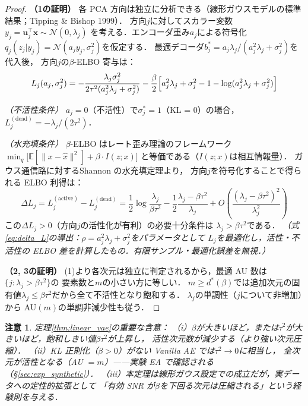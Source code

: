 \documentclass[11pt,a4paper]{jsarticle}
\newtheorem{remark}{注意}
\begin{document}
\begin{proof}
\textbf{（1の証明）}
各 PCA 方向は独立に分析できる（線形ガウスモデルの標準結果；Tipping \& Bishop 1999）．
方向$j$に対してスカラー変数$y_j = \boldsymbol{u}_j^\top \boldsymbol{x} \sim \mathcal{N}(0, \lambda_j)$
を考える．エンコーダ重み$a_j$による符号化$q_j(z_j|y_j) = \mathcal{N}(a_j y_j, \sigma_j^2)$を仮定する．
最適デコーダ$b_j^* = a_j\lambda_j/(a_j^2\lambda_j + \sigma_j^2)$を代入後，
方向$j$の$\beta$-ELBO 寄与は：
\begin{equation}
  L_j(a_j, \sigma_j^2)
  = -\frac{\lambda_j \sigma_j^2}{2\tau^2(a_j^2\lambda_j + \sigma_j^2)}
    - \frac{\beta}{2}\Bigl[a_j^2\lambda_j + \sigma_j^2 - 1 - \log(a_j^2\lambda_j + \sigma_j^2)\Bigr]
  \label{eq:elbo_j}
\end{equation}

\textit{（不活性条件）}
$a_j = 0$（不活性）で$\sigma_j^* = 1$（KL = 0）の場合，$L_j^{(\mathrm{dead})} = -\lambda_j/(2\tau^2)$．

\textit{（水充填条件）}
$\beta$-ELBO はレート歪み理論\cite{cover2006elements}のフレームワーク
$\min_{q}\bigl[\mathbb{E}[\|x - \hat{x}\|^2] + \beta \cdot I(z;x)\bigr]$
と等価である（$I(z;x)$は相互情報量）．
ガウス通信路に対するShannon の水充填定理\cite{cover2006elements}より，
方向$j$を符号化することで得られる ELBO 利得は：
\begin{equation}
  \Delta L_j = L_j^{(\mathrm{active})} - L_j^{(\mathrm{dead})}
  = \frac{1}{2}\log\frac{\lambda_j}{\beta\tau^2} - \frac{1}{2}\frac{\lambda_j - \beta\tau^2}{\lambda_j} + O\!\left(\frac{(\lambda_j - \beta\tau^2)^2}{\lambda_j^2}\right)
  \label{eq:delta_L}
\end{equation}
この$\Delta L_j > 0$（方向$j$の活性化が有利）の必要十分条件は
$\lambda_j > \beta\tau^2$である．
\textit{（式\eqref{eq:delta_L}の導出：$\rho = a_j^2\lambda_j + \sigma_j^2$をパラメータとして
$L_j$を最適化し，活性・不活性の ELBO 差を計算したもの．有限サンプル・最適化誤差を無視．）}

\textbf{（2, 3の証明）}
(1)より各次元は独立に判定されるから，最適 AU 数は$\{j : \lambda_j > \beta\tau^2\}$の
要素数と$m$の小さい方に等しい．
$m \geq d^*(\beta)$では追加次元の固有値$\lambda_j \leq \beta\tau^2$だから全て不活性となり飽和する．
$\lambda_j$の単調性（$j$について非増加）から AU$(m)$の単調非減少性も従う．
\end{proof}

\begin{remark}
定理\ref{thm:linear_vae}の重要な含意：
（i）$\beta$が大きいほど，または$\tau^2$が大きいほど，飽和しきい値$\beta\tau^2$が上昇し，
活性次元数が減少する（より強い次元圧縮）．
（ii）KL 正則化（$\beta > 0$）がない Vanilla AE では$\tau^2 \to 0$に相当し，
全次元が活性となる（AU $= m$）——実験 EA で確認される（§\ref{sec:exp_synthetic}）．
（iii）本定理は線形ガウス設定での成立だが，実データへの定性的拡張として
「有効 SNR が$\beta$を下回る次元は圧縮される」という経験則を与える．
\end{remark}
\end{document}
